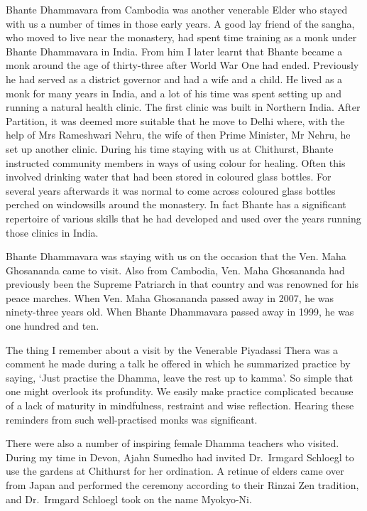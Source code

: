 \enlargethispage{\baselineskip}

Bhante Dhammavara\cite{dhammavara} from Cambodia was another venerable Elder who
stayed with us a number of times in those early years. A good lay friend
of the sangha, who moved to live near the monastery, had spent time
training as a monk under Bhante Dhammavara in India. From him I later
learnt that Bhante became a monk around the age of thirty-three after
World War One had ended. Previously he had served as a district governor
and had a wife and a child. He lived as a monk for many years in India,
and a lot of his time was spent setting up and running a natural health
clinic. The first clinic was built in Northern India. After Partition\cite{partition},
it was deemed more suitable that he move to Delhi where, with
the help of Mrs Rameshwari Nehru\cite{nehru}, the wife of then
Prime Minister, Mr Nehru, he set up another
clinic. During his time staying with us at Chithurst, Bhante instructed
community members in ways of using colour for healing. Often this
involved drinking water that had been stored in coloured glass bottles.
For several years afterwards it was normal to come across coloured glass
bottles perched on windowsills around the monastery. In fact Bhante has
a significant repertoire of various skills that he had developed and
used over the years running those clinics in India.

Bhante Dhammavara was staying with us on the occasion that the
Ven. Maha Ghosananda\cite{ghosananda} came to visit. Also from Cambodia, Ven. Maha
Ghosananda had previously been the Supreme Patriarch in that country and
was renowned for his peace marches. When Ven. Maha Ghosananda passed
away in 2007, he was ninety-three years old. When Bhante Dhammavara
passed away in 1999, he was one hundred and ten.

The thing I remember about a visit by the Venerable Piyadassi Thera was
a comment he made during a talk he offered in which he summarized
practice by saying, `Just practise the Dhamma, leave the rest up to
kamma'. So simple that one might overlook its profundity. We easily make
practice complicated because of a lack of maturity in mindfulness,
restraint and wise reflection. Hearing these reminders from such
well-practised monks was significant.

There were also a number of inspiring female Dhamma teachers who
visited. During my time in Devon, Ajahn Sumedho had invited Dr.~Irmgard
Schloegl to use the gardens at Chithurst for her ordination. A retinue
of elders came over from Japan and performed the ceremony according to
their Rinzai Zen tradition, and Dr.~Irmgard Schloegl took on the name
Myokyo-Ni.

